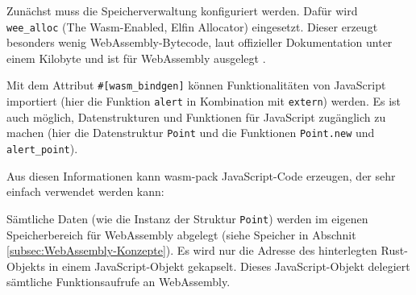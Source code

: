 

Zunächst muss die Speicherverwaltung konfiguriert werden. Dafür wird \lstinline{wee_alloc} (The Wasm-Enabled, Elfin Allocator) eingesetzt. Dieser erzeugt besonders wenig WebAs\-sembly-Bytecode, laut offizieller Dokumentation unter einem Kilobyte und ist für WebAssembly ausgelegt \cite{WeeAlloc}.

Mit dem Attribut \lstinline{#[wasm_bindgen]} können Funktionalitäten von JavaScript importiert (hier die Funktion \lstinline{alert} in Kombination mit \lstinline{extern}) werden. Es ist auch möglich, Datenstrukturen und Funktionen für JavaScript zugänglich zu machen (hier die Datenstruktur \lstinline{Point} und die Funktionen \lstinline{Point.new} und \lstinline{alert_point}).

Aus diesen Informationen kann wasm-pack JavaScript-Code erzeugen, der sehr einfach verwendet werden kann:



Sämtliche Daten (wie die Instanz der Struktur \lstinline{Point}) werden im eigenen Speicherbereich für WebAssembly abgelegt (siehe Speicher in Abschnit \ref{subsec:WebAssembly-Konzepte}). Es wird nur die Adresse des hinterlegten Rust-Objekts in einem JavaScript-Objekt gekapselt. Dieses JavaScript-Objekt delegiert sämtliche Funktionsaufrufe an WebAssembly.
